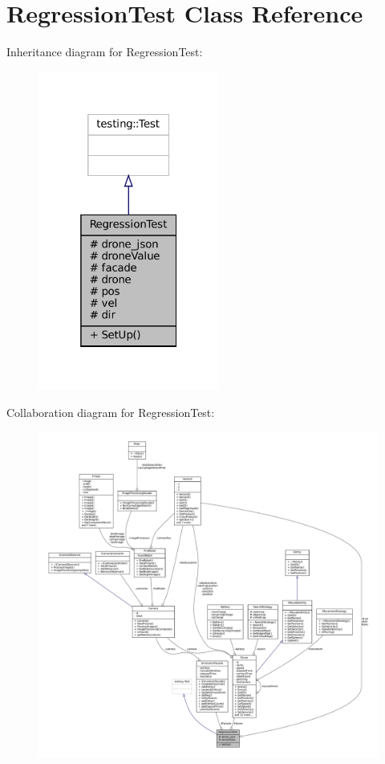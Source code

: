 \hypertarget{classRegressionTest}{}\section{Regression\+Test Class Reference}
\label{classRegressionTest}


Inheritance diagram for Regression\+Test\+:\nopagebreak
\begin{figure}[H]
\begin{center}
\leavevmode
\includegraphics[width=169pt]{classRegressionTest__inherit__graph}
\end{center}
\end{figure}


Collaboration diagram for Regression\+Test\+:\nopagebreak
\begin{figure}[H]
\begin{center}
\leavevmode
\includegraphics[width=350pt]{classRegressionTest__coll__graph}
\end{center}
\end{figure}
